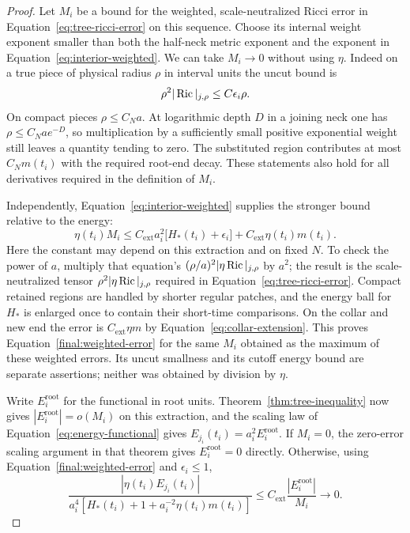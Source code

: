 \begin{proof}
Let $M_i$ be a bound for the weighted, scale-neutralized Ricci error
in Equation~\eqref{eq:tree-ricci-error} on this sequence.  Choose its
internal weight exponent smaller than both the half-neck metric
exponent and the exponent in Equation~\eqref{eq:interior-weighted}.
We can take $M_i\to0$ without using $\eta$.  Indeed on a true piece
of physical radius $\rho$ in interval units the uncut bound is
\[
 \rho^2|\operatorname{Ric}|_{j,\rho}\le C\epsilon_i\rho.
\]
On compact pieces $\rho\le C_Na$.  At logarithmic depth $D$ in a
joining neck one has $\rho\le C_Nae^{-D}$, so multiplication by a
sufficiently small positive exponential weight still leaves a
quantity tending to zero.  The substituted region contributes at
most $C_Nm(t_i)$ with the required root-end decay.  These statements
also hold for all derivatives required in the definition of $M_i$.

Independently, Equation~\eqref{eq:interior-weighted} supplies the
stronger bound relative to the energy:
\begin{equation}\label{final:weighted-error}
 \eta(t_i)M_i
 \le C_{\mathrm{ext}}a_i^2\bigl[H_*(t_i)+\epsilon_i\bigr]
                         +C_{\mathrm{ext}}\eta(t_i)m(t_i).
\end{equation}
Here the constant may depend on this extraction and on fixed $N$.
To check the power of $a$, multiply that equation's
$(\rho/a)^2|\eta\operatorname{Ric}|_{j,\rho}$ by $a^2$; the result is the
scale-neutralized tensor $\rho^2|\eta\operatorname{Ric}|_{j,\rho}$ required in
Equation~\eqref{eq:tree-ricci-error}.  Compact retained regions are
handled by shorter regular patches, and the energy ball for $H_*$
is enlarged once to contain their short-time comparisons.  On the
collar and new end the error is $C_{\mathrm{ext}}\eta m$ by
Equation~\eqref{eq:collar-extension}.  This proves
Equation~\eqref{final:weighted-error} for the same $M_i$ obtained as
the maximum of these weighted errors.  Its uncut smallness and its
cutoff energy bound are separate assertions; neither was obtained
by division by $\eta$.

Write $E_i^{\mathrm{root}}$ for the functional in root units.
Theorem~\ref{thm:tree-inequality} now gives
$|E_i^{\mathrm{root}}|=o(M_i)$ on this extraction, and the scaling
law of Equation~\eqref{eq:energy-functional} gives
$E_{j_i}(t_i)=a_i^2E_i^{\mathrm{root}}$.  If $M_i=0$, the
zero-error scaling argument in that theorem gives
$E_i^{\mathrm{root}}=0$ directly.  Otherwise, using
Equation~\eqref{final:weighted-error} and $\epsilon_i\le1$,
\begin{equation}\label{final:ratio-test}
 \frac{|\eta(t_i)E_{j_i}(t_i)|}
 {a_i^4[H_*(t_i)+1+a_i^{-2}\eta(t_i)m(t_i)]}
 \le C_{\mathrm{ext}}\frac{|E_i^{\mathrm{root}}|}{M_i}
 \longrightarrow0.
\end{equation}


\end{proof}
